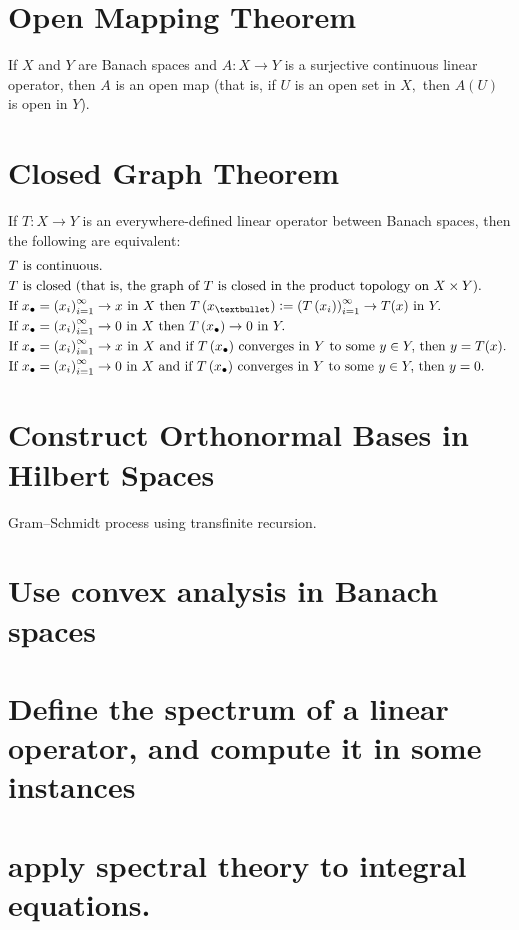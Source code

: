 \documentclass{article}
\begin{document}
\section*{Open Mapping Theorem}
If $X$ and $Y$ are Banach spaces and $A : X \to Y$ is a surjective continuous linear operator, then $A$ is an open map (that is, if $U$ is an open set in $X,$ then $A(U)$ is open in $Y$).


\section*{Closed Graph Theorem}
If $T : X \to Y$ is an everywhere-defined linear operator between Banach spaces, then the following are equivalent:
\begin{align*}
& \text{$T$ is continuous. } \\
& \text{$T$ is closed (that is, the graph of $T$ is closed in the product topology on $X \times Y).$ } \\
& \text{If $x_{\bullet} =  \left(x_i \right)_{i=1}^{\infty} \to x$ in $X$ then $T \left(x_{\textbullet} \right) \vcentcolon=  \left(T \left(x_i \right) \right)_{i=1}^{\infty} \to T(x)$ in $Y.$ } \\
& \text{If $x_{\bullet} =  \left(x_i \right)_{i=1}^{\infty} \to 0$ in $X$ then $T \left(x_{\bullet} \right) \to 0$ in $Y.$ } \\
& \text{If $x_{\bullet} =  \left(x_i \right)_{i=1}^{\infty} \to x$ in $X$ and if $T \left(x_{\bullet} \right)$ converges in $Y$ to some $y \in Y,$ then $y = T(x).$ } \\
& \text{If $x_{\bullet} =  \left(x_i \right)_{i=1}^{\infty} \to 0$ in $X$ and if $T \left(x_{\bullet} \right)$ converges in $Y$ to some $y \in Y,$ then $y = 0.$}
\end{align*}

\section*{Construct Orthonormal Bases in Hilbert Spaces}
Gram–Schmidt process using transfinite recursion.

\section*{Use convex analysis in Banach spaces}

\section*{Define the spectrum of a linear operator, and compute it in some instances}

\section*{apply spectral theory to integral equations.}
\end{document}
